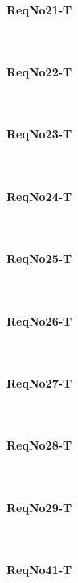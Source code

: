 \paragraph{ReqNo21-T}\mbox{}\\ %


\paragraph{ReqNo22-T}\mbox{}\\ %


\paragraph{ReqNo23-T}\mbox{}\\ %


\paragraph{ReqNo24-T}\mbox{}\\ %

\paragraph{ReqNo25-T}\mbox{}\\ %


\paragraph{ReqNo26-T}\mbox{}\\ %

\paragraph{ReqNo27-T}\mbox{}\\ %


\paragraph{ReqNo28-T}\mbox{}\\ %


\paragraph{ReqNo29-T}\mbox{}\\ %


\paragraph{ReqNo41-T}\mbox{}\\ %

